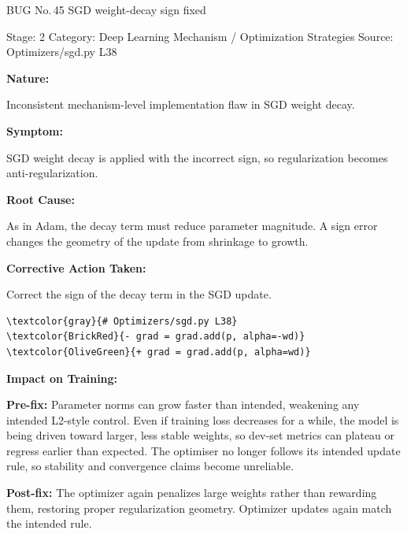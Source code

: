 \documentclass[10pt]{article}
\newcommand{\FieldLabel}[1]{%
 {\bfseries #1:}\par
}
\begin{document}
\begin{bugbox}{BUG No.\,45 \quad SGD weight-decay sign fixed}
{\color{MetaGray}\small Stage: 2 \;\textbar\; Category: Deep Learning Mechanism / Optimization Strategies \;\textbar\; Source: Optimizers/sgd.py L38\par}
\vspace{0.22em}
\FieldLabel{Nature}
Inconsistent mechanism-level implementation flaw in SGD weight decay.
\par
\vspace{0.35em}
\FieldLabel{Symptom}
SGD weight decay is applied with the incorrect sign, so regularization becomes anti-regularization.
\par
\vspace{0.35em}
\FieldLabel{Root Cause}
As in Adam, the decay term must reduce parameter magnitude. A sign error changes the geometry of the update from shrinkage to growth.
\par
\vspace{0.35em}
\FieldLabel{Corrective Action Taken}
Correct the sign of the decay term in the SGD update.
\par
\vspace{0.35em}
\begin{Verbatim}[commandchars=\\\{\},fontsize=\footnotesize,breaklines=true,breaksymbol={},frame=leftline,framerule=2pt,rulecolor=\color{gray!40},xleftmargin=6pt,formatcom=\singlespacing]
\textcolor{gray}{# Optimizers/sgd.py L38}
\textcolor{BrickRed}{- grad = grad.add(p, alpha=-wd)}
\textcolor{OliveGreen}{+ grad = grad.add(p, alpha=wd)}
\end{Verbatim}
\vspace{0.22em}
\FieldLabel{Impact on Training}
\textbf{Pre-fix:} Parameter norms can grow faster than intended, weakening any intended L2-style control. Even if training loss decreases for a while, the model is being driven toward larger, less stable weights, so dev-set metrics can plateau or regress earlier than expected. The optimiser no longer follows its intended update rule, so stability and convergence claims become unreliable. \par\smallskip
\textbf{Post-fix:} The optimizer again penalizes large weights rather than rewarding them, restoring proper regularization geometry. Optimizer updates again match the intended rule. 
\par
\vspace{0.35em}
\end{bugbox}
\end{document}
